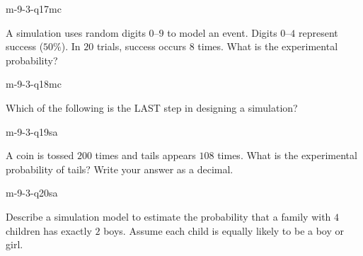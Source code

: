\begin{practiceQuestion}{m-9-3-q17}{mc}
\begin{questionText}
A simulation uses random digits $0$--$9$ to model an event. Digits $0$--$4$ represent success ($50\%$). In $20$ trials, success occurs $8$ times. What is the experimental probability?
\end{questionText}
\end{practiceQuestion}

\begin{practiceQuestion}{m-9-3-q18}{mc}
\begin{questionText}
Which of the following is the LAST step in designing a simulation?
\end{questionText}
\end{practiceQuestion}


\begin{practiceQuestion}{m-9-3-q19}{sa}
\begin{questionText}
A coin is tossed $200$ times and tails appears $108$ times. What is the experimental probability of tails? Write your answer as a decimal.
\end{questionText}
\end{practiceQuestion}

\begin{practiceQuestion}{m-9-3-q20}{sa}
\begin{questionText}
Describe a simulation model to estimate the probability that a family with $4$ children has exactly $2$ boys. Assume each child is equally likely to be a boy or girl.
\end{questionText}
\end{practiceQuestion}

